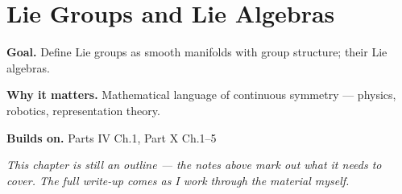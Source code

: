 \chapter{Lie Groups and Lie Algebras}
\label{ch:10-differential-geometry-06}

\begin{chapterintro}
\textbf{Goal.} Define Lie groups as smooth manifolds with group structure; their Lie algebras.

\textbf{Why it matters.} Mathematical language of continuous symmetry — physics, robotics, representation theory.

\textbf{Builds on.} Parts IV Ch.1, Part X Ch.1–5
\end{chapterintro}

\textit{This chapter is still an outline --- the notes above mark out what it needs to cover. The full write-up comes as I work through the material myself.}
